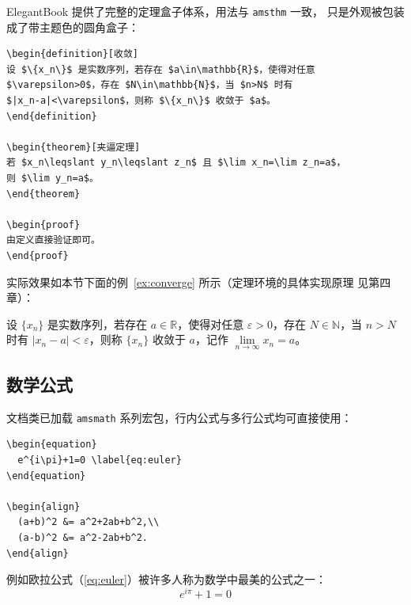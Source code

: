 ElegantBook 提供了完整的定理盒子体系，用法与 \texttt{amsthm} 一致，
只是外观被包装成了带主题色的圆角盒子：

\begin{lstlisting}
\begin{definition}[收敛]
设 $\{x_n\}$ 是实数序列，若存在 $a\in\mathbb{R}$，使得对任意
$\varepsilon>0$，存在 $N\in\mathbb{N}$，当 $n>N$ 时有
$|x_n-a|<\varepsilon$，则称 $\{x_n\}$ 收敛于 $a$。
\end{definition}

\begin{theorem}[夹逼定理]
若 $x_n\leqslant y_n\leqslant z_n$ 且 $\lim x_n=\lim z_n=a$，
则 $\lim y_n=a$。
\end{theorem}

\begin{proof}
由定义直接验证即可。
\end{proof}
\end{lstlisting}

实际效果如本节下面的例~\ref{ex:converge} 所示（定理环境的具体实现原理
见第四章）：

\begin{definition}[收敛]\label{ex:converge}
设 $\{x_n\}$ 是实数序列，若存在 $a\in\mathbb{R}$，使得对任意
$\varepsilon>0$，存在 $N\in\mathbb{N}$，当 $n>N$ 时有
$|x_n-a|<\varepsilon$，则称 $\{x_n\}$ 收敛于 $a$，记作
$\lim\limits_{n\to\infty}x_n=a$。
\end{definition}

\subsection{数学公式}

文档类已加载 \texttt{amsmath} 系列宏包，行内公式与多行公式均可直接使用：

\begin{lstlisting}
\begin{equation}
  e^{i\pi}+1=0 \label{eq:euler}
\end{equation}

\begin{align}
  (a+b)^2 &= a^2+2ab+b^2,\\
  (a-b)^2 &= a^2-2ab+b^2.
\end{align}
\end{lstlisting}

例如欧拉公式（\eqref{eq:euler}）被许多人称为数学中最美的公式之一：
\begin{equation}
  e^{i\pi}+1=0 \label{eq:euler}
\end{equation}

